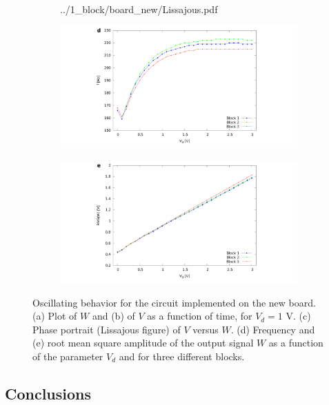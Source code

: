 \documentclass[a4paper,11pt,aps,secnumarabic,balancelastpage,amsmath,amssymb,floatfix,table]{article}
\begin{document}
\begin{figure}[H]
\begin{subfigure}{.39\textwidth}
        {../1_block/board_new/Lissajous.pdf}
    \end{subfigure}
    \begin{subfigure}{.49\textwidth}
        \includegraphics[width=\linewidth,trim={10cm 0 9cm 0},clip,left]
        {../1_block/board_new/freq_board.pdf}
    \end{subfigure}
    \begin{subfigure}{.49\textwidth}
        \centering
        \includegraphics[width=\linewidth,trim={9cm 0 10cm 0},clip,right]
        {../1_block/board_new/rms_board.pdf}
    \end{subfigure}
    \caption{Oscillating behavior for the circuit implemented on
    the new board. (a) Plot of $W$ and (b) of $V$ as a
    function of time, for $V_d=1$ V.
    (c) Phase portrait (Lissajous figure) of $V$ versus $W$. (d)
    Frequency and (e) root mean square amplitude of the
    output signal $W$ as a function of the parameter $V_d$ and for
    three different blocks.}
    \label{fig:oscillation board new}
\end{figure}

\subsection{Conclusions}\label{sec:conclusions}
\end{document}
